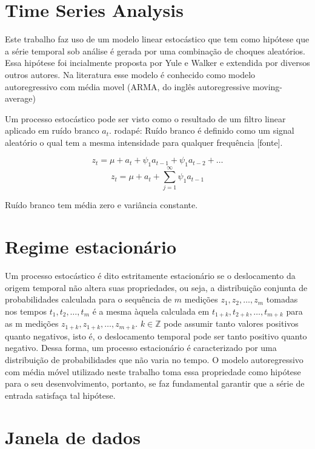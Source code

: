 \documentclass[
	12pt,				%
	openright,			%
	oneside,			%
	a4paper,			%
	english,			%
	french,				%
	spanish,			%
	brazil				%
	]{abntex2}
\begin{document}

\chapter{Time Series Analysis}

Este trabalho faz uso de um modelo linear estocástico que tem como hipótese que a série temporal sob análise é gerada por uma combinação de choques aleatórios. Essa hipótese foi incialmente proposta por Yule e Walker e extendida por diversos outros autores.
Na literatura esse modelo é conhecido como modelo autoregressivo com média movel (ARMA, do inglês autoregressive moving-average)

Um processo estocástico pode ser visto como o resultado de um filtro linear aplicado em ruído branco $a_t$. 
rodapé: Ruído branco é definido como um signal aleatório o qual tem a mesma intensidade para qualquer frequência [fonte].

$$ z_t = \mu + a_t + \psi_1a_{t-1} + \psi_1a_{t-2} + \dots $$
$$ z_t = \mu + a_t + \sum_{j=1}^{\infty}\psi_1a_{t-1} $$

Ruído branco tem média zero e variância constante. 

\chapter{Regime estacionário}

Um processo estocástico é dito estritamente estacionário se o deslocamento da origem temporal não altera suas propriedades, ou seja, a distribuição conjunta de probabilidades calculada para o sequência de $m$ medições $z_1,z_2,\dots,z_m$ tomadas nos tempos $t_1, t_2, \dots, t_m$ é a mesma àquela calculada em $t_{1+k}, t_{2+k}, \dots, t_{m+k}$ para as m medições $z_{1+k},z_{1+k},\dots,z_{m+k}$. $k\in\mathbb{Z}$ pode assumir tanto valores positivos quanto negativos, isto é, o deslocamento temporal pode ser tanto positivo quanto negativo. Dessa forma, 
um processo estacionário é caracterizado por uma distribuição de probabilidades que não varia no tempo. O modelo autoregressivo com média móvel utilizado neste trabalho toma essa propriedade como hipótese para o seu desenvolvimento, portanto, se faz fundamental garantir que a série de entrada satisfaça tal hipótese.

\chapter{Janela de dados}
\end{document}

